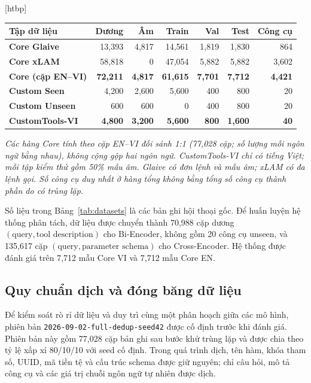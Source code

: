 \documentclass[10pt,twocolumn,a4paper]{article}
\makeatletter
\renewenvironment{table}{\@dblfloat{table}}{\end@dblfloat}
\newcommand{\tabletext}{\small}
\makeatother
\begin{document}
\begin{table}[htbp]
    \centering
    \caption{Thống kê các bộ dữ liệu đánh giá gọi công cụ tiếng Việt.}
    \label{tab:datasets}
    \tabletext
    \begin{tabular*}{\textwidth}{@{\extracolsep{\fill}}lrrrrrr@{}}
        \toprule
        \textbf{Tập dữ liệu} & \textbf{Dương} & \textbf{Âm} & \textbf{Train} & \textbf{Val} & \textbf{Test} & \textbf{Công cụ} \\
        \midrule
        \textbf{Core Glaive} & 13,393 & 4,817 & 14,561 & 1,819 & 1,830 & 864 \\
        \textbf{Core xLAM} & 58,818 & 0 & 47,054 & 5,882 & 5,882 & 3,602 \\
        \textbf{Core (cặp EN--VI)} & \textbf{72,211} & \textbf{4,817} & \textbf{61,615} & \textbf{7,701} & \textbf{7,712} & \textbf{4,421} \\
        \midrule
        \textbf{Custom Seen} & 4,200 & 2,600 & 5,600 & 400 & 800 & 20 \\
        \textbf{Custom Unseen} & 600 & 600 & 0 & 400 & 800 & 20 \\
        \textbf{CustomTools-VI} & \textbf{4,800} & \textbf{3,200} & \textbf{5,600} & \textbf{800} & \textbf{1,600} & \textbf{40} \\
        \bottomrule
    \end{tabular*}
\end{table}

\textit{Các hàng Core tính theo cặp EN--VI đối sánh 1:1 (77,028 cặp; số lượng mỗi ngôn ngữ bằng nhau), không cộng gộp hai ngôn ngữ. CustomTools-VI chỉ có tiếng Việt; mỗi tập kiểm thử gồm 50\% mẫu âm. Glaive có đơn lệnh và mẫu âm; xLAM có đa lệnh gọi. Số công cụ duy nhất ở hàng tổng không bằng tổng số công cụ thành phần do có trùng lặp.}

Số liệu trong Bảng~\ref{tab:datasets} là các bản ghi hội thoại gốc. Để huấn luyện hệ thống phân tách, dữ liệu được chuyển thành 70,988 cặp dương $(\text{query},\text{tool description})$ cho Bi-Encoder, không gồm 20 công cụ unseen, và 135,617 cặp $(\text{query},\text{parameter schema})$ cho Cross-Encoder. Hệ thống được đánh giá trên 7,712 mẫu Core VI và 7,712 mẫu Core EN.

\subsection{Quy chuẩn dịch và đóng băng dữ liệu}
Để kiểm soát rò rỉ dữ liệu và duy trì cùng một phân hoạch giữa các mô hình, phiên bản \texttt{2026-09-02-full-dedup-seed42} được cố định trước khi đánh giá. Phiên bản này gồm 77,028 cặp bản ghi sau bước khử trùng lặp và được chia theo tỷ lệ xấp xỉ 80/10/10 với seed cố định. Trong quá trình dịch, tên hàm, khóa tham số, UUID, mã tiền tệ và cấu trúc schema được giữ nguyên; chỉ câu hỏi, mô tả công cụ và các giá trị chuỗi ngôn ngữ tự nhiên được dịch.
\end{document}
